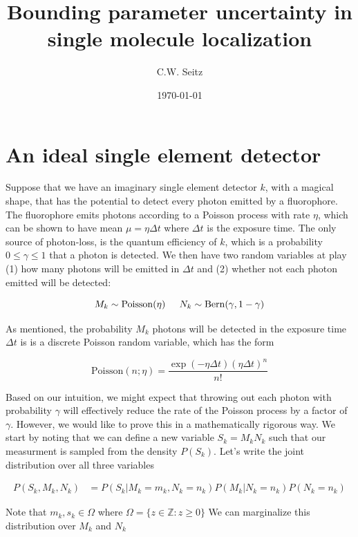 \documentclass{article}
\title{Bounding parameter uncertainty in single molecule localization}
\author{C.W. Seitz}
\date{\today}
\begin{document}
\maketitle

\section{An ideal single element detector}

Suppose that we have an imaginary single element detector $k$, with a magical shape, that has the potential to detect every photon emitted by a fluorophore. The fluorophore emits photons according to a Poisson process with rate $\eta$, which can be shown to have mean $\mu = \eta\Delta t$ where $\Delta t$ is the exposure time. The only source of photon-loss, is the quantum efficiency of $k$, which is a probability $0 \leq \gamma \leq 1$ that a photon is detected. We then have two random variables at play (1) how many photons will be emitted in $\Delta t$ and (2) whether not each photon emitted will be detected:

\begin{equation*}
M_{k} \sim \mathrm{Poisson}(\eta)\hspace{0.2in}N_{k} \sim \mathrm{Bern}(\gamma, 1-\gamma)
\end{equation*}

As mentioned, the probability $M_{k}$ photons will be detected in the exposure time $\Delta t$ is is a discrete Poisson random variable, which has the form 

\begin{equation*}
\mathrm{Poisson}(n; \eta) = \frac{\exp\left({-\eta\Delta t}\right)(\eta\Delta t)^{n}}{n!}
\end{equation*}

Based on our intuition, we might expect that throwing out each photon with probability $\gamma$ will effectively reduce the rate of the Poisson process by a factor of $\gamma$. However, we would like to prove this in a mathematically rigorous way. We start by noting that we can define a new variable $S_{k} = M_{k}N_{k}$ such that our measurment is sampled from the density $P(S_{k})$. Let's write the joint distribution over all three variables

\begin{align*}
P(S_{k},M_{k},N_{k}) &= P(S_{k}|M_{k}=m_{k},N_{k}=n_{k})P(M_{k}|N_{k}=n_{k})P(N_{k}=n_{k})
\end{align*}

Note that $m_{k},s_{k} \in \Omega$ where $\Omega = \{z \in \mathbb{Z}: z \geq 0\}$ We can marginalize this distribution over $M_{k}$ and $N_{k}$
\end{document}
